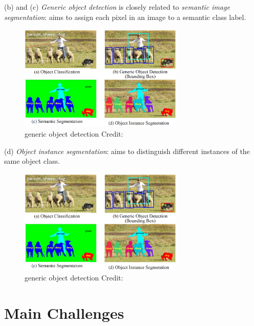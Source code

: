\documentclass{beamer}
\begin{document}
\begin{frame}{}
    (b) and (c) \emph{Generic object detection} is closely related to \emph{semantic image segmentation}:  aims to assign each pixel in an image to a semantic class label.
    \begin{figure}
        \includegraphics[width=0.7\textwidth]{images/detector_type.PNG}
        \caption{generic object detection
        \hbox{\scriptsize Credit:}
        }
    \end{figure}
\end{frame}

\begin{frame}{}
    (d) \emph{Object instance segmentation}: aims to distinguish different instances of the same object class.
    \begin{figure}
        \includegraphics[width=0.7\textwidth]{images/detector_type.PNG}
        \caption{generic object detection
        \hbox{\scriptsize Credit:}
        }
    \end{figure}
\end{frame}


\section{Main Challenges}
\end{document}
